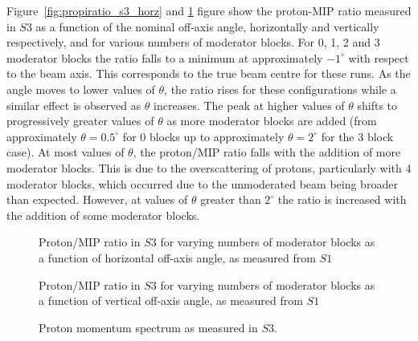   Figure~\ref{fig:propiratio_s3_horz} and \ref{fig:propiratio_s3_vert} figure show the proton-MIP ratio measured in $\mathit{S3}$ as a function of the nominal off-axis angle, horizontally and vertically respectively, and for various numbers of moderator blocks.
  For 0, 1, 2 and 3 moderator blocks the ratio falls to a minimum at approximately $-1^{\circ}$ with respect to the beam axis. This corresponds to the true beam centre for these runs.
  As the angle moves to lower values of $\theta$, the ratio rises for these configurations while a similar effect is observed as $\theta$ increases.
  The peak at higher values of $\theta$ shifts to progressively greater values of $\theta$ as more moderator blocks are added (from approximately $\theta = 0.5^{\circ}$ for 0 blocks up to approximately $\theta = 2^{\circ}$ for the 3 block case).
  At most values of $\theta$, the proton/MIP ratio falls with the addition of more moderator blocks. 
  This is due to the overscattering of protons, particularly with 4 moderator blocks, which occurred due to the unmoderated beam being broader than expected.
  However, at values of $\theta$ greater than $2^{\circ}$ the ratio is increased with the addition of some moderator blocks.
  
  \begin{figure}[!ht]
    \begin{minipage}[t]{0.48\textwidth}
      \begin{adjustbox}{max totalsize={\textwidth}{.35\textheight}, center}
	
      \end{adjustbox}
      \caption{Proton/MIP ratio in $\mathit{S3}$ for varying numbers of moderator blocks as a function of horizontal off-axis angle, as measured from $\mathit{S1}$}
      \label{fig:propiratio_s3_horz}
    \end{minipage}
    \hspace{0.3cm}
    \begin{minipage}[t]{0.48\textwidth}
      \begin{adjustbox}{max totalsize={\textwidth}{.35\textheight}, center}
	
      \end{adjustbox}
      \caption{Proton/MIP ratio in $\mathit{S3}$ for varying numbers of moderator blocks as a function of vertical off-axis angle, as measured from $\mathit{S1}$}
	\label{fig:propiratio_s3_vert}
    \end{minipage}	
  \end{figure}

  \begin{figure}[ht]
    \centering
    \begin{adjustbox}{max totalsize={0.8\textwidth}, center}
      
    \end{adjustbox}
    \caption{Proton momentum spectrum as measured in $\mathit{S3}$.}
      \label{fig:s3promom}
  \end{figure}

